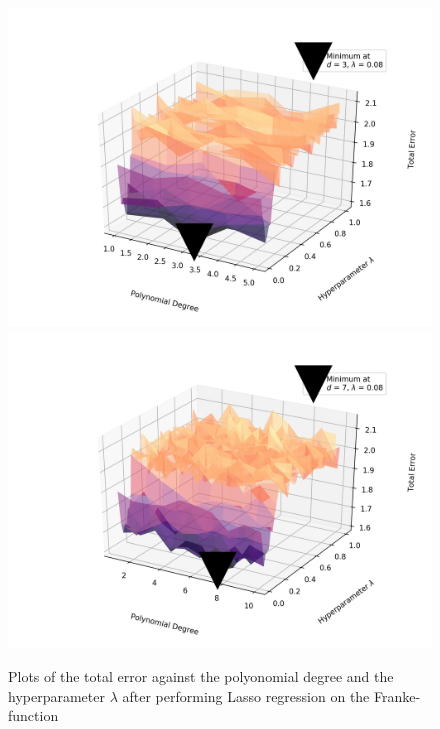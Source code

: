 \documentclass[a4paper,10pt,english]{article}
\begin{document}
\begin{figure}[H]
	\centering 
	\includegraphics[scale=0.47]{../franke_output/part_E_5.png}
	\includegraphics[scale=0.47]{../franke_output/part_E_5_highdeg.png}
	\caption{
		Plots of the total error against the polyonomial degree and the hyperparameter $\lambda$ after performing Lasso regression on the Franke-function 
	}
	\label{part_e5}
\end{figure}
\end{document}
